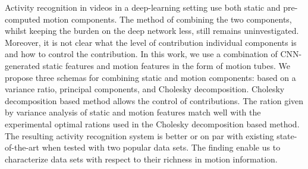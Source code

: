 Activity recognition in videos in a deep-learning setting use both static and pre-computed motion components. The method of combining the two components, whilst keeping the burden on the deep network less, still remains uninvestigated. Moreover, it is not clear what the level of contribution individual components is and how to control the contribution. In this work, we use a combination of CNN-generated static features and motion features in the form of motion tubes. We propose three schemas  for combining static and motion components: based on a variance ratio, principal components, and Cholesky decomposition. Cholesky decomposition based method allows the control of contributions. The ration given by variance analysis of static and motion features match well with the experimental optimal rations used in the Cholesky decomposition based method. The resulting activity recognition system is better or on par with existing state-of-the-art when tested with two popular data sets. The finding enable us to characterize data sets  with respect to their richness in  motion information. 